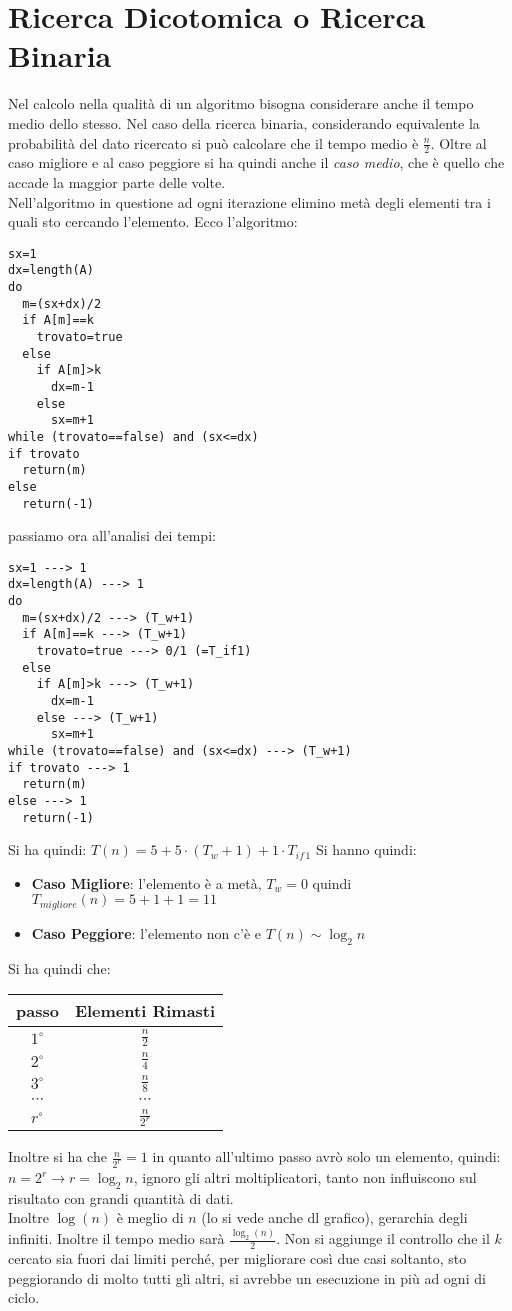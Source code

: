 \documentclass[a4paper,12pt,oneside,tikz]{book}
\begin{document}
\section{Ricerca Dicotomica o Ricerca Binaria}
Nel calcolo nella qualità di un algoritmo bisogna considerare anche il tempo medio dello stesso. Nel caso della ricerca binaria, considerando equivalente la probabilità del dato ricercato si può calcolare che il tempo medio è $\frac{n}{2}$. Oltre al caso migliore e al caso peggiore si ha quindi anche il \textit{caso medio}, che è quello che accade la maggior parte delle volte.\\
Nell'algoritmo in questione ad ogni iterazione elimino metà degli elementi tra i quali sto cercando l'elemento.
Ecco l'algoritmo:
\begin{verbatim}
sx=1
dx=length(A)
do
  m=(sx+dx)/2
  if A[m]==k
    trovato=true
  else 
    if A[m]>k
      dx=m-1
    else 
      sx=m+1
while (trovato==false) and (sx<=dx)
if trovato
  return(m)
else
  return(-1)
\end{verbatim}
\newpage
passiamo ora all'analisi dei tempi:
\begin{verbatim}
sx=1 ---> 1
dx=length(A) ---> 1
do
  m=(sx+dx)/2 ---> (T_w+1)
  if A[m]==k ---> (T_w+1)
    trovato=true ---> 0/1 (=T_if1)
  else 
    if A[m]>k ---> (T_w+1)
      dx=m-1
    else ---> (T_w+1)
      sx=m+1
while (trovato==false) and (sx<=dx) ---> (T_w+1)
if trovato ---> 1
  return(m)
else ---> 1
  return(-1)
\end{verbatim}
Si ha quindi: $T(n)=5+5\cdot (T_w +1)+1\cdot T_{if\,1}$
Si hanno quindi:
\begin{itemize}
\item \textbf{Caso Migliore}: l'elemento è a metà, $T_w=0$ quindi $T_{migliore}(n)=5+1+1=11$
\item \textbf{Caso Peggiore}: l'elemento non c'è e $T(n)\sim\log_2 n$
\end{itemize}
Si ha quindi che:\\
\begin{center}
\begin{tabular}{|c|c|}
\hline
\textbf{passo} & \textbf{Elementi Rimasti}\\ \hline
$1^{\circ}$ & $\frac{n}{2}$\\ \hline
$2^{\circ}$ & $\frac{n}{4}$\\ \hline
$3^{\circ}$ & $\frac{n}{8}$\\ \hline
$\cdots$ & $\cdots$\\ \hline
$r^{\circ}$ & $\frac{n}{2^r}$\\ \hline
\end{tabular}
\end{center}
Inoltre si ha che $\frac{n}{2^r}=1$ in quanto all'ultimo passo avrò solo un elemento, quindi: $n=2^r\rightarrow r=\log_2 n$, ignoro gli altri moltiplicatori, tanto non influiscono sul risultato con grandi quantità di dati.\\
Inoltre $\log(n)$ è meglio di $n$ (lo si vede anche dl grafico), gerarchia degli infiniti. Inoltre il tempo medio sarà $\frac{\log_2(n)}{2}$.
Non si aggiunge il controllo che il $k$ cercato sia fuori dai limiti perché, per migliorare così due casi soltanto, sto peggiorando di molto tutti gli altri, si avrebbe un esecuzione in più ad ogni di ciclo.
\newpage
\end{document}
